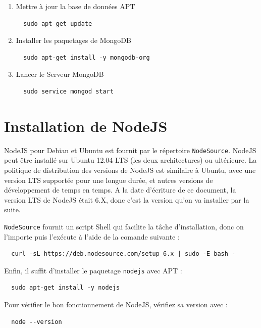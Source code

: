 \documentclass[a4paper,11pt,oneside]{report}
\begin{document}
\begin{appendices}
\begin{enumerate}
  \item{Mettre à jour la base de données APT}
  \begin{verbatim}
  sudo apt-get update
  \end{verbatim}

  \item{Installer les paquetages de MongoDB}
  \begin{verbatim}
  sudo apt-get install -y mongodb-org
  \end{verbatim}

  \item{Lancer le Serveur MongoDB}
  \begin{verbatim}
  sudo service mongod start
  \end{verbatim}
\end{enumerate}

\newpage

\section{Installation de NodeJS}

NodeJS pour Debian et Ubuntu est fournit par le répertoire \texttt{NodeSource}. NodeJS peut être installé sur Ubuntu 12.04 LTS (les deux architectures) ou ultérieure. La politique de distribution des versions de NodeJS est similaire à Ubuntu, avec une version LTS supportée pour une longue durée, et autres versions de développement de temps en temps. A la date d'écriture de ce document, la version LTS de NodeJS était 6.X, donc c'est la version qu'on va installer par la suite.
\newline

\texttt{NodeSource} fournit un script Shell qui facilite la tâche d'installation, donc on l'importe puis l'exécute à l'aide de la comande suivante :
  \begin{verbatim}
  curl -sL https://deb.nodesource.com/setup_6.x | sudo -E bash -
  \end{verbatim}

Enfin, il suffit d'installer le paquetage \texttt{nodejs} avec APT :
  \begin{verbatim}
  sudo apt-get install -y nodejs
  \end{verbatim}

Pour vérifier le bon fonctionnement de NodeJS, vérifiez sa version avec :
  \begin{verbatim}
  node --version
  \end{verbatim}
\newpage


\end{appendices}
\end{document}
